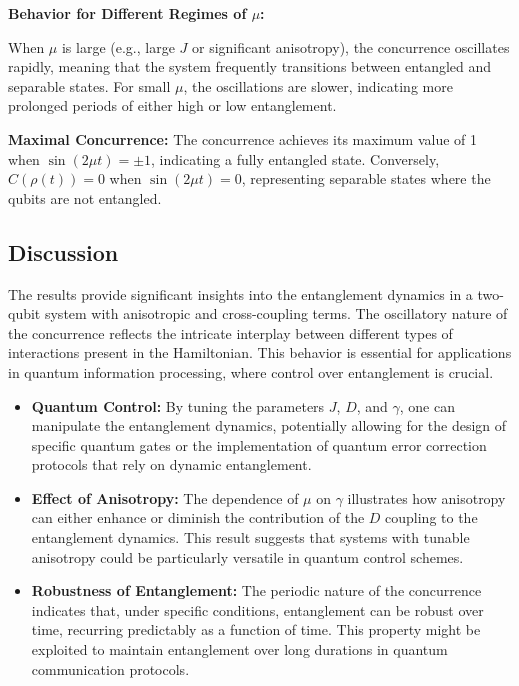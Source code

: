  \textbf{Behavior for Different Regimes of \(\mu\):}

 When \(\mu\) is large (e.g., large \(J\) 
        or significant anisotropy), the concurrence oscillates 
        rapidly, meaning that the system frequently transitions 
        between entangled and separable states. For small \(\mu\), the oscillations are slower, 
        indicating more prolonged periods of either high or low entanglement.

\textbf{Maximal Concurrence:}
 The concurrence achieves its maximum value of 1 when \(\sin(2 \mu t) = \pm 1\), indicating a fully entangled state.
 Conversely, \(C(\rho(t)) = 0\) when \(\sin(2 \mu t) = 0\), representing separable states where the qubits are not entangled.

\subsection{Discussion}

The results provide significant insights into the entanglement 
dynamics in a two-qubit system with anisotropic and cross-coupling terms. 
The oscillatory nature of the concurrence reflects the intricate interplay 
between different types of interactions present in the Hamiltonian. 
This behavior is essential for applications in quantum information 
processing, where control over entanglement is crucial.

\begin{itemize}
    \item \textbf{Quantum Control:} By tuning the parameters 
    \(J\), \(D\), and \(\gamma\), one can manipulate 
    the entanglement dynamics, potentially allowing for 
    the design of specific quantum gates or the 
    implementation of quantum error correction protocols that rely on dynamic entanglement.

    \item \textbf{Effect of Anisotropy:} The dependence of \(\mu\) on 
    \(\gamma\) illustrates how anisotropy can either enhance or diminish 
    the contribution of the \(D\) coupling to the entanglement dynamics. 
    This result suggests that systems with tunable anisotropy could be 
    particularly versatile in quantum control schemes.

    \item \textbf{Robustness of Entanglement:} The periodic nature of the concurrence indicates that, under specific conditions, entanglement can be robust over time, recurring predictably as a function of time. This property might be exploited to maintain entanglement over long durations in quantum communication protocols.
\end{itemize}

